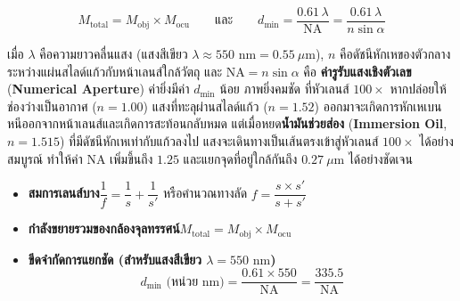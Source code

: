 \begin{equation}
    M_{\text{total}} = M_{\text{obj}} \times M_{\text{ocu}} \qquad \text{และ} \qquad d_{\min} = \frac{0.61\,\lambda}{\text{NA}} = \frac{0.61\,\lambda}{n \sin\alpha}
    \label{eq:lab10_abbe}
\end{equation}

เมื่อ $\lambda$ คือความยาวคลื่นแสง (แสงสีเขียว $\lambda \approx 550\text{ nm} = 0.55\ \mu\text{m}$), $n$ คือดัชนีหักเหของตัวกลางระหว่างแผ่นสไลด์แก้วกับหน้าเลนส์ใกล้วัตถุ และ $\text{NA} = n\sin\alpha$ คือ \textbf{ค่ารูรับแสงเชิงตัวเลข} (\textbf{Numerical Aperture}) ค่ายิ่งมีค่า $d_{\min}$ น้อย ภาพยิ่งคมชัด ที่หัวเลนส์ $100\times$ หากปล่อยให้ช่องว่างเป็นอากาศ ($n = 1.00$) แสงที่ทะลุผ่านสไลด์แก้ว ($n = 1.52$) ออกมาจะเกิดการหักเหเบนหนีออกจากหน้าเลนส์และเกิดการสะท้อนกลับหมด แต่เมื่อหยด\textbf{น้ำมันช่วยส่อง} (\textbf{Immersion Oil}, $n = 1.515$) ที่มีดัชนีหักเหเท่ากับแก้วลงไป แสงจะเดินทางเป็นเส้นตรงเข้าสู่หัวเลนส์ $100\times$ ได้อย่างสมบูรณ์ ทำให้ค่า $\text{NA}$ เพิ่มขึ้นถึง $1.25$ และแยกจุดที่อยู่ใกล้กันถึง $0.27\ \mu\text{m}$ ได้อย่างชัดเจน

\begin{conceptbox}
\begin{itemize}
    \item \textbf{สมการเลนส์บาง}\quad $\dfrac{1}{f} = \dfrac{1}{s} + \dfrac{1}{s'}$ หรือคำนวณทางลัด $f = \dfrac{s \times s'}{s + s'}$
    \item \textbf{กำลังขยายรวมของกล้องจุลทรรศน์}\quad $M_{\text{total}} = M_{\text{obj}} \times M_{\text{ocu}}$
    \item \textbf{ขีดจำกัดการแยกชัด (สำหรับแสงสีเขียว $\lambda = 550\text{ nm}$)}
    \begin{equation*}
        d_{\min}\text{ (หน่วย nm)} = \frac{0.61 \times 550}{\text{NA}} = \frac{335.5}{\text{NA}}
    \end{equation*}
\end{itemize}
\end{conceptbox}

